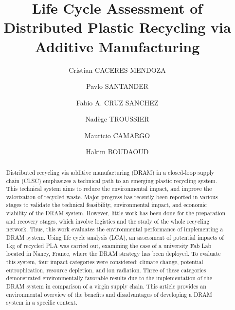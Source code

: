 \documentclass[12pt]{elsarticle} %
\begin{document}
\begin{frontmatter}

  \title{Life Cycle Assessment of Distributed Plastic Recycling via Additive Manufacturing}
    \author[UL]{Cristian CACERES MENDOZA%
  }
    \author[USACH]{Pavlo SANTANDER%
  }
  
    \author[UL]{Fabio A. CRUZ SANCHEZ%
  }
  
    \author[CREIDD]{Nadège TROUSSIER%
  }
  
    \author[UL]{Mauricio CAMARGO%
  }
  
    \author[UL]{Hakim BOUDAOUD%
  }
  
  
  \begin{abstract}
  Distributed recycling via additive manufacturing (DRAM) in a closed-loop supply chain (CLSC) emphasizes a technical path to an emerging plastic recycling system. This technical system aims to reduce the environmental impact, and improve the valorization of recycled waste. Major progress has recently been reported in various stages to validate the technical feasibility, environmental impact, and economic viability of the DRAM system. However, little work has been done for the preparation and recovery stages, which involve logistics and the study of the whole recycling network. Thus, this work evaluates the environmental performance of implementing a DRAM system. Using life cycle analysis (LCA), an assessment of potential impacts of 1kg of recycled PLA was carried out, examining the case of a university Fab Lab located in Nancy, France, where the DRAM strategy has been deployed. To evaluate this system, four impact categories were considered: climate change, potential eutrophication, resource depletion, and ion radiation. Three of these categories demonstrated environmentally favorable results due to the implementation of the DRAM system in comparison of a virgin supply chain. This article provides an environmental overview of the benefits and disadvantages of developing a DRAM system in a specific context.
  \end{abstract}
  
 \end{frontmatter}
\end{document}
